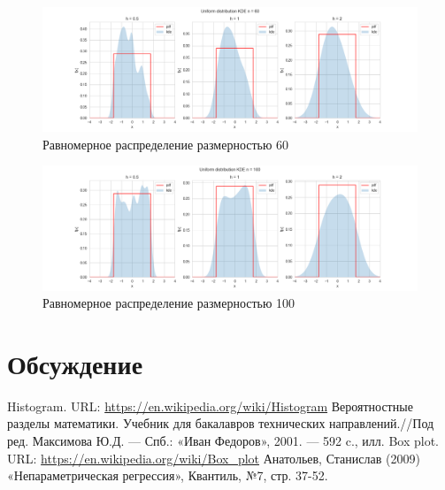 \documentclass[a4paper,14pt]{article}
\begin{document}
	\begin{figure}[H]
		\centering
		\includegraphics[scale=0.35]{../image/lab4/lab4_kde_uniform_60.png}
		\caption{Равномерное распределение размерностью 60}
	\end{figure}
	
	\begin{figure}[H]
		\centering
		\includegraphics[scale=0.35]{../image/lab4/lab4_kde_uniform_100.png}
		\caption{Равномерное распределение размерностью 100}
	\end{figure}
	
	
	\section{Обсуждение}

	\newpage
	
	\begin{thebibliography}{4}
		Histogram. URL: \url{https://en.wikipedia.org/wiki/Histogram}
		Вероятностные разделы математики. Учебник для бакалавров технических направлений.//Под ред. Максимова Ю.Д. --- Спб.: «Иван Федоров», 2001. --- 592 c., илл.
		Box plot. URL: \url{https://en.wikipedia.org/wiki/Box_plot}
		Анатольев, Станислав (2009) «Непараметрическая регрессия», Квантиль, №7, стр. 37-52.
	\end{thebibliography}
\end{document}
